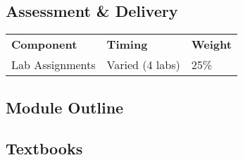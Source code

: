 \documentclass[12pt]{article}
\begin{document}
\subsection{Assessment \& Delivery}
    \begin{tabular}{ l l l }
        \textbf{Component} & \textbf{Timing} & \textbf{Weight} \\
        Lab Assignments & Varied (4 labs) & 25\% \\

    \end{tabular}
\subsection{Module Outline}
\subsection{Textbooks}
\end{document}
